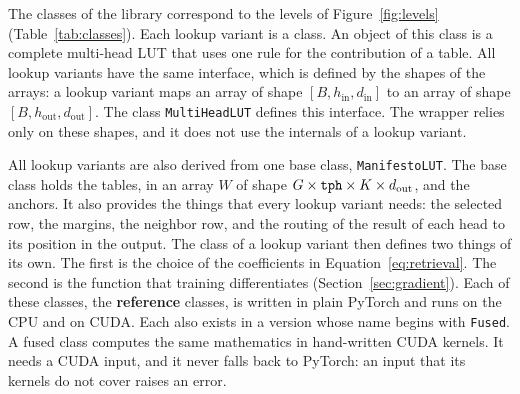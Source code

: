 \documentclass[11pt]{article}
\DeclareRobustCommand{\code}[1]{{\renewcommand{\_}{\textunderscore\allowbreak}\texttt{#1}}}
\newcommand{\term}[1]{\textbf{#1}}
\begin{document}
The classes of the library correspond to the levels of Figure~\ref{fig:levels}
(Table~\ref{tab:classes}). Each lookup variant is a class. An object of this class is a complete multi-head LUT
that uses one rule for the contribution of a table. All lookup variants have the same interface, which is
defined by the shapes of the arrays: a lookup variant maps an array of shape $[B,h_\text{in},d_\text{in}]$ to an
array of shape $[B,h_\text{out},d_\text{out}]$. The class \code{MultiHeadLUT} defines this interface. The
wrapper relies only on these shapes, and it does not use the internals of a lookup variant.

All lookup variants are also derived from one base class, \code{ManifestoLUT}. The base class holds the tables,
in an array $W$ of shape $G\times\code{tph}\times K\times d_\text{out}$, and the anchors. It also
provides the things that every lookup variant needs: the selected row, the margins, the neighbor row, and the
routing of the result of each head to its position in the output. The class of a lookup variant then defines two things
of its own. The first is the choice of the coefficients in Equation~\eqref{eq:retrieval}. The second is
the function that training differentiates (Section~\ref{sec:gradient}). Each of these classes, the
\term{reference} classes, is written in plain PyTorch and runs on the CPU and on CUDA. Each also exists
in a version whose name begins with \code{Fused}. A fused class computes the same mathematics in
hand-written CUDA kernels. It needs a CUDA input, and it never falls back to PyTorch: an input that its
kernels do not cover raises an error.
\end{document}
